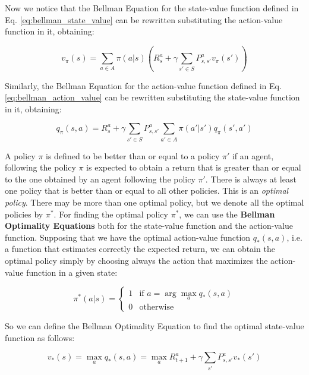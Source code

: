 Now we notice that the Bellman Equation for the state-value function defined in Eq. \ref{eq:bellman_state_value} can be rewritten substituting the action-value function in it, obtaining:

\begin{equation}
    v_{\pi}(s) = \sum_{a \in A} \pi(a|s)(R_s^a + \gamma \sum_{s' \in S} P_{s, s'}^a v_{\pi}(s'))
\end{equation}

Similarly, the Bellman Equation for the action-value function defined in Eq. \ref{eq:bellman_action_value} can be rewritten substituting the state-value function in it, obtaining:

\begin{equation}
    q_{\pi}(s, a) = R_s^a + \gamma \sum_{s' \in S} P_{s, s'}^a \sum_{a' \in A} \pi(a'|s')q_{\pi}(s', a')
\end{equation}



A policy $\pi$ is defined to be better than or equal to a policy $\pi'$ if an agent, following the policy $\pi$ is expected to obtain a return that is greater than or equal to the one obtained by an agent following the policy $\pi'$.
There is always at least one policy that is better than or equal to all other policies.
This is an \textit{optimal policy}.
There may be more than one optimal policy, but we denote all the optimal policies by $\pi^*$.
For finding the optimal policy $\pi^*$, we can use the \textbf{Bellman Optimality Equations} both for the state-value function and the action-value function.
Supposing that we have the optimal action-value function $q_*(s, a)$, i.e. a function that estimates correctly the expected return,
we can obtain the optimal policy simply by choosing always the action that maximizes the action-value function in a given state:

\begin{equation}
    \label{eq:optimal_policy}
    \pi^*(a|s) = \begin{cases}
        1 & \text{if } a = \arg\max_{a} q_*(s, a) \\
        0 & \text{otherwise}
    \end{cases}
\end{equation}


So we can define the Bellman Optimality Equation to find the optimal state-value function as follows:

\begin{equation} \label{eq:optimal_state_value}
    v_*(s) = \max_{a} q_*(s, a) = \max_{a} R_{t+1}^a + \gamma \sum_{s'} P_{s, s'}^a v_*(s')
\end{equation}

